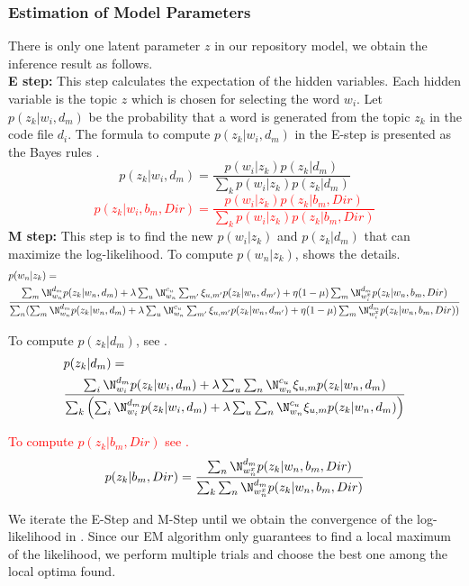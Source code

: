 \subsubsection{Estimation of Model Parameters}
There is only one latent parameter $z$ in our repository model, we obtain the inference
result as follows.\\
{\bf E step:}
This step calculates the expectation of the hidden variables. Each hidden variable is the topic $z$ which
is chosen for selecting the word $w_i$. Let $p(z_k|w_i,d_m)$ be the probability that
a word is generated from the topic $z_k$ in the code file $d_i$. 
The formula to compute $p(z_k|w_i,d_m)$ in the E-step is presented as the Bayes rules .
\[
\label{equ:estep}
p(z_k|w_i,d_m) = \frac { p(w_i|z_k)p(z_k|d_m) }{ \sum _{k}{p(w_i|z_k)p(z_k|d_m)} }\]
\textcolor{red}{
\[
\label{equ:estep2}
p(z_k|w_i,b_m,Dir) = \frac { p(w_i|z_k)p(z_k|b_m,Dir) }{ \sum _{k}{p(w_i|z_k)p(z_k|b_m,Dir)} }\]
}
{\bf M step:}
This step is to find the new $p(w_i|z_k)$ and $p(z_k|d_m)$ that can maximize the log-likelihood.
To compute $p(w_n|z_k)$,  shows the details.
\textcolor{red}{
\begin{align}
\label{equ:mstep1}
\begin{split}
&p(w_n|z_k)=\\
&\frac{\sum _{ m }{\N_{w_n}^{d_m}p(z_k|w_n,d_m)}+\lambda \sum _{ u}\N_{w_n}^{c_u}\sum _{m'}\xi_{u,m'}p(z_k|w_n,d_{m'} ) + \eta (1-\mu)\sum_{m}{\N_{w_i^x}^{d_m}}p(z_k|w_n,b_m,Dir)}{\sum _{n}(\sum _{ m }{\N_{w_n}^{d_m}p(z_k|w_n,d_m)}+\lambda \sum _{ u}\N_{w_n}^{c_u}\sum _{m'}\xi_{u,m'}p(z_k|w_n,d_{m'}) + \eta (1-\mu)\sum_{m}{\N_{w_i^x}^{d_m}}p(z_k|w_n,b_m,Dir))}\\
\end{split}
\end{align}
}

To compute $p(z_k|d_m)$, see .
\begin{align}
\label{equ:mstep2}
\begin{split}
&p(z_k|d_m) = \\
&\frac{\sum _{i}{\N_{w_i}^{d_m}p(z_k|w_i,d_m)+\lambda \sum _{u} \sum _{n}{\N_{w_n}^{c_u}\xi  _{u,m}p(z_k|w_n,d_m)}}}{\sum _{k}\left(\sum _{i}{\N_{w_i}^{d_m}p(z_k|w_i,d_m)+\lambda \sum _{u} \sum _{n}{\N_{w_n}^{c_u}\xi  _{u,m}p(z_k|w_n,d_m)}}\right)}\\
\end{split}
\end{align}

\textcolor{red}{
To compute $p(z_k|b_m,Dir)$ see .
\begin{align}
\label{equ:mstep3}
\begin{split}
p(z_k|b_m, Dir)=\frac{\sum_{n}\N_{w_n^x}^{d_m} p(z_k|w_n,b_m,Dir)}{\sum_{k} \sum_{n}{\N_{w_n^x}^{d_m} p(z_k|w_n,b_m,Dir)}}
\end{split}
\end{align}
}

We iterate the E-Step and M-Step until we obtain the
convergence of the log-likelihood in . Since our
EM algorithm only guarantees to find a local maximum of
the likelihood, we perform multiple trials and choose the
best one among the local optima found.




